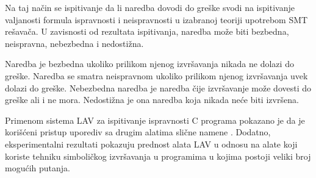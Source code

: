 \documentclass[12pt,oneside]{memoir}
\begin{document}
Na taj način se ispitivanje da li naredba dovodi do greške svodi na ispitivanje valjanosti formula ispravnosti i neispravnosti u izabranoj teoriji upotrebom SMT rešavača. U zavisnosti od rezultata ispitivanja, naredba može biti bezbedna, neispravna, nebezbedna i nedostižna. \par 
Naredba je bezbedna	ukoliko prilikom njenog izvršavanja nikada ne dolazi do greške. Naredba se smatra neispravnom ukoliko prilikom njenog izvršavanja uvek dolazi do greške. Nebezbedna naredba je naredba čije izvršavanje može dovesti do greške ali i ne mora. Nedostižna je ona naredba koja nikada neće biti izvršena.

\par
Primenom sistema LAV za ispitivanje ispravnosti C programa pokazano je da je korišćeni pristup uporediv sa drugim alatima slične namene \cite{vstteLAV12}.  Dodatno, eksperimentalni rezultati pokazuju prednost alata LAV u odnosu na alate koji koriste tehniku simboličkog izvršavanja u programima u kojima postoji veliki broj mogućih putanja. 
\end{document}
